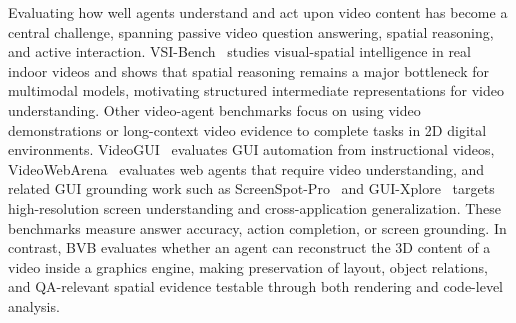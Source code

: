 Evaluating how well agents understand and act upon video content has become a central challenge, spanning passive video question answering, spatial reasoning, and active interaction. VSI-Bench~\cite{yang2024thinkinginspace} studies visual-spatial intelligence in real indoor videos and shows that spatial reasoning remains a major bottleneck for multimodal models, motivating structured intermediate representations for video understanding.
Other video-agent benchmarks focus on using video demonstrations or long-context video evidence to complete tasks in 2D digital environments. VideoGUI~\cite{lin2024videogui} evaluates GUI automation from instructional videos, VideoWebArena~\cite{jang2024videowebarena} evaluates web agents that require video understanding, and related GUI grounding work such as ScreenSpot-Pro~\cite{li2025screenspotpro} and GUI-Xplore~\cite{sun2025guixplore} targets high-resolution screen understanding and cross-application generalization. These benchmarks measure answer accuracy, action completion, or screen grounding. In contrast, BVB evaluates whether an agent can reconstruct the 3D content of a video inside a graphics engine, making preservation of layout, object relations, and QA-relevant spatial evidence testable through both rendering and code-level analysis.
